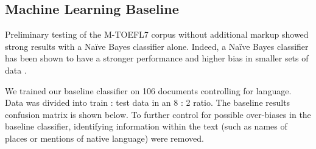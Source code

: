 \documentclass[10pt, a4paper]{article}
\begin{document}
\subsection{Machine Learning Baseline\label{sec:ml-baseline}}
Preliminary testing of the M-TOEFL7 corpus without additional markup showed strong results with a Na\"ive Bayes classifier alone. Indeed, a Na\"ive Bayes classifier has been shown to have a stronger performance and higher bias in smaller sets of data \cite{forman-2004}. 

We trained our baseline classifier on 106 documents controlling for language. Data was divided into train : test data in an 8 : 2 ratio. The baseline results confusion matrix is shown below. To further control for possible over-biases in the baseline classifier, identifying information within the text (such as names of places or mentions of native language) were removed. 
\end{document}
